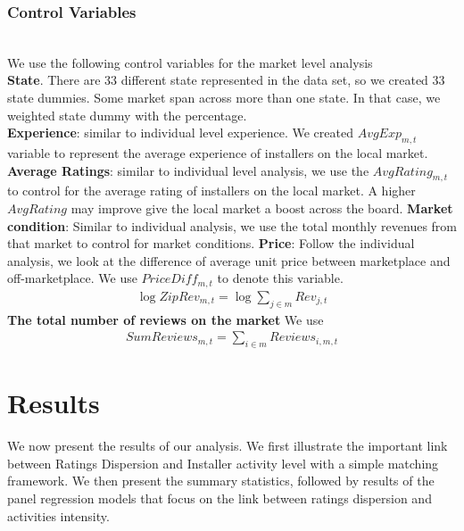\documentclass[msom,blindrev]{informs3}
\begin{document}
\subsubsection{Control Variables}\hfill\\
We use the following control variables for the market level analysis\\
\textbf{State}. There are 33 different state represented in the data set, so we created 33 state dummies. Some market span across more than one state. In that case, we weighted state dummy with the percentage. \\
\textbf{Experience}: similar to individual level experience. We created $AvgExp_{m,t}$ variable to represent the average experience of installers on the local market. \\
\textbf{Average Ratings}: similar to individual level analysis, we use the $AvgRating_{m,t}$ to control for the average rating of installers on the local market. A higher $AvgRating$ may improve give the local market a boost across the board. 
\textbf{Market condition}:
Similar to individual analysis, we use the total monthly revenues from that market to control for market conditions.
\textbf{Price}: Follow the individual analysis, we look at the difference of average unit price between marketplace and off-marketplace. We use $PriceDiff_{m,t}$ to denote this variable.  \\ 
\begin{align*}
\log ZipRev_{m,t}=\log \sum_{j\in m}Rev_{j,t}
\end{align*}
 \textbf{The total number of reviews on the market } We use
\begin{align*}
SumReviews_{m,t}=\sum_{i\in m} Reviews_{i,m,t}
\end{align*}


\section{Results}
We now present the results of our analysis. We first illustrate the important link between Ratings Dispersion and Installer activity level with a simple matching framework. We then present the summary statistics, followed by results of the panel regression models that focus on the link between ratings dispersion and activities intensity. 
\end{document}
